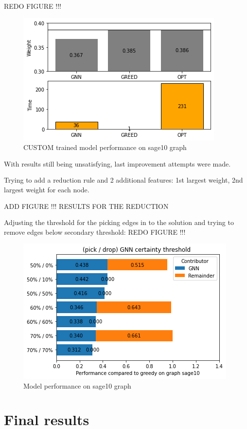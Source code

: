 REDO FIGURE !!!
\begin{figure}[H]
    \centering
    \includegraphics[scale=1.0]{figures/CUSTOMtrainSAGE10}
    \caption{CUSTOM trained model performance on sage10 graph}
    \label{model performance}
\end{figure}

With results still being unsatisfying, last improvement attempts were made.

Trying to add a reduction rule and 2 additional features: 1st largest weight, 2nd largest weight for each node.

ADD FIGURE !!! RESULTS FOR THE REDUCTION

Adjusting the threshold for the picking edges in to the solution and trying to remove edges below secondary threshold:
REDO FIGURE !!!
\begin{figure}[H]
    \centering
    \includegraphics[scale=1.0]{figures/ThresholdDemo}
    \caption{Model performance on sage10 graph}
    \label{Model performance on sage10 graph}
\end{figure}

\section{Final results}

